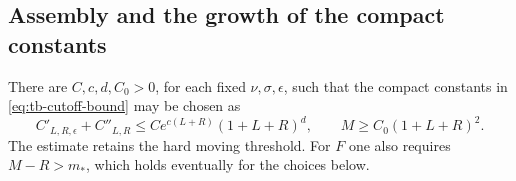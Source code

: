 \subsection{Assembly and the growth of the compact constants}
\begin{proposition}
There are $C,c,d,C_0>0$, for each fixed $\nu,\sigma,\epsilon$, such
that the compact constants in \eqref{eq:tb-cutoff-bound} may be chosen as
\begin{equation}
 C'_{L,R,\epsilon}+C''_{L,R}
 \le C e^{c(L+R)}(1+L+R)^d,
 \qquad M\ge C_0(1+L+R)^2.
 \label{eq:gb-compact-growth}
\end{equation}
The estimate retains the hard moving threshold. For $F$ one also
requires $M-R>m_*$, which holds eventually for the choices below.
\label{prop:gb-growth}
\end{proposition}
